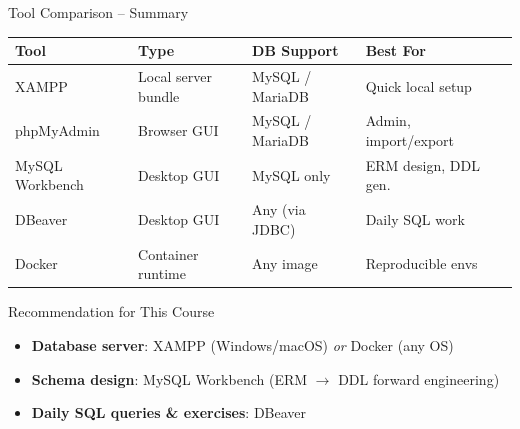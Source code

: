 \begin{frame}{Tool Comparison -- Summary}
  \begin{center}
  \renewcommand{\arraystretch}{1.3}
  \small
  \begin{tabular}{@{}lllll@{}}
    \toprule
    \textbf{Tool}      & \textbf{Type}       & \textbf{DB Support}   & \textbf{Best For} \\
    \midrule
    XAMPP              & Local server bundle & MySQL / MariaDB       & Quick local setup \\
    phpMyAdmin         & Browser GUI         & MySQL / MariaDB       & Admin, import/export \\
    MySQL Workbench    & Desktop GUI         & MySQL only            & ERM design, DDL gen. \\
    DBeaver            & Desktop GUI         & Any (via JDBC)        & Daily SQL work \\
    Docker             & Container runtime   & Any image             & Reproducible envs \\
    \bottomrule
  \end{tabular}
  \end{center}

  \begin{block}{Recommendation for This Course}
    \begin{itemize}
      \item \textbf{Database server}: XAMPP (Windows/macOS) \textit{or} Docker (any OS)
      \item \textbf{Schema design}: MySQL Workbench (ERM $\to$ DDL forward engineering)
      \item \textbf{Daily SQL queries \& exercises}: DBeaver
    \end{itemize}
  \end{block}
\end{frame}
